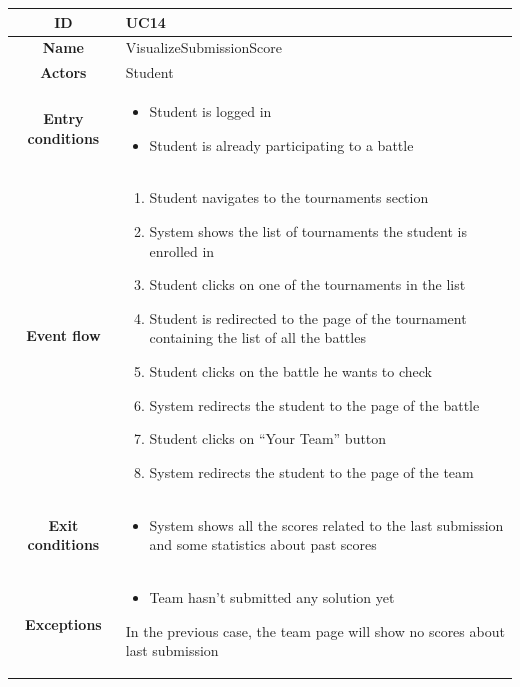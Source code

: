 \begin{center}
    \begin{tabular}{ |c|m{10cm}| }
        \hline
        \textbf{ID} & UC14 \\
        \hline
        \textbf{Name} & VisualizeSubmissionScore \\
        \hline
        \textbf{Actors} & Student \\
        \hline
        \textbf{Entry conditions} &
        \begin{itemize}
            \item Student is logged in
            \item Student is already participating to a battle
        \end{itemize} \\
        \hline
        \textbf{Event flow} &
        \begin{enumerate}
            \item Student navigates to the tournaments section
            \item System shows the list of tournaments the student is enrolled in
            \item Student clicks on one of the tournaments in the list
            \item Student is redirected to the page of the tournament containing the list of all the battles
            \item Student clicks on the battle he wants to check 
            \item System redirects the student to the page of the battle
            \item Student clicks on “Your Team” button
            \item System redirects the student to the page of the team
        \end{enumerate} \\
        \hline
        \textbf{Exit conditions} &
        \begin{itemize}
            \item System shows all the scores related to the last submission and some statistics about past scores
        \end{itemize} \\
        \hline
        \textbf{Exceptions} & 
        \begin{itemize}
            \item Team hasn’t submitted any solution yet
        \end{itemize} 
        In the previous case, the team page will show no scores about last submission \\

\end{tabular}
\end{center}
